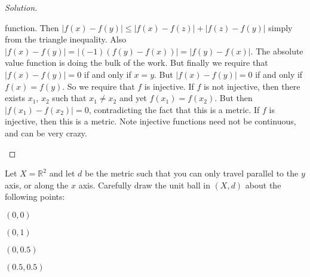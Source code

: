 \documentclass[crop=false,class=article,oneside]{standalone}
\begin{document}
\begin{proof}[Solution]
\begin{enumerate}
                      function. Then
                      $|f(x)-f(y)|\leq{|f(x)-f(z)|+|f(z)-f(y)|}$
                      simply from the triangle inequality. Also
                      $|f(x)-f(y)|%
                       =|(-1)(f(y)-f(x))|=|f(y)-f(x)|$.
                      The absolute value function is doing the
                      bulk of the work.
                      But finally we require that
                      $|f(x)-f(y)|=0$ if and only if
                      $x=y$. But $|f(x)-f(y)|=0$ if and only
                      if $f(x)=f(y)$. So we require that $f$
                      is injective. If $f$ is not injective,
                      then there exists $x_{1}$, $x_{2}$
                      such that
                      $x_{1}\ne{x_{2}}$ and yet
                      $f(x_{1})=f(x_{2})$. But then
                      $|f(x_{1})-f(x_{2})|=0$, contradicting the
                      fact that this is a metric. If $f$ is
                      injective, then this is a metric. Note
                      injective functions need not be
                      continuous, and can be very crazy.
            \end{enumerate}
        \end{proof}
        \begin{problem}
            \label{FUNCTIONAL:HOMEWORK:2:PROBLEM:4}
            Let $X=\mathbb{R}^{2}$ and let $d$ be the metric
            such that you can only travel parallel to the
            $y$ axis, or along the $x$ axis. Carefully draw
            the unit ball in $(X,d)$ about the following points:
            \begin{enumerate}
                \begin{multicols}{4}
                    \item $(0,0)$
                    \item $(0,1)$
                    \item $(0, 0.5)$
                    \item $(0.5,0.5)$
                \end{multicols}
            \end{enumerate}
        \end{problem}
\end{document}
